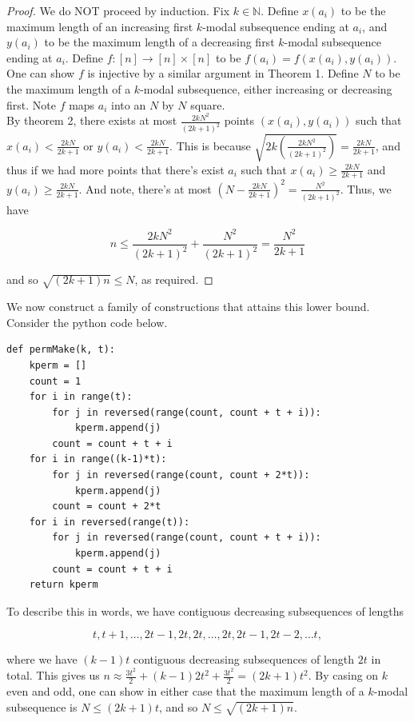 \documentclass{article}
\begin{document}
\begin{proof}
We do NOT proceed by induction. Fix $k \in \mathbb{N}$. Define $x(a_i)$ to be the maximum length of an increasing first $k$-modal subsequence ending at $a_i$, and $y(a_i)$ to be the maximum length of a decreasing first $k$-modal subsequence ending at $a_i$. Define $f : [n] \rightarrow [n] \times [n]$ to be $f(a_i) = f(x(a_i), y(a_i))$. One can show $f$ is injective by a similar argument in Theorem 1. Define $N$ to be the maximum length of a $k$-modal subsequence, either increasing or decreasing first. Note $f$ maps $a_i$ into an $N$ by $N$ square. \\

By theorem 2, there exists at most $\frac{2kN^2}{(2k+1)^2}$ points $(x(a_i), y(a_i))$ such that $x(a_i) < \frac{2kN}{2k+1}$ or $y(a_i) < \frac{2kN}{2k+1}$. This is because $\sqrt{2k(\frac{2kN^2}{(2k+1)^2})} = \frac{2kN}{2k+1}$, and thus if we had more points that there's exist $a_i$ such that $x(a_i) \geq \frac{2kN}{2k+1}$ and $y(a_i) \geq \frac{2kN}{2k+1}$. And note, there's at most $(N-\frac{2kN}{2k+1})^2 = \frac{N^2}{(2k+1)^2}$. Thus, we have 

$$n \leq \frac{2kN^2}{(2k+1)^2} + \frac{N^2}{(2k+1)^2} = \frac{N^2}{2k+1}$$

and so $\sqrt{(2k+1)n} \leq N$, as required.
\end{proof}

We now construct a family of constructions that attains this lower bound. Consider the python code below. \\

\begin{verbatim}
def permMake(k, t):
    kperm = []
    count = 1
    for i in range(t):
        for j in reversed(range(count, count + t + i)):
            kperm.append(j)
        count = count + t + i
    for i in range((k-1)*t):
        for j in reversed(range(count, count + 2*t)):
            kperm.append(j)
        count = count + 2*t
    for i in reversed(range(t)):
        for j in reversed(range(count, count + t + i)):
            kperm.append(j)
        count = count + t + i
    return kperm
\end{verbatim}

To describe this in words, we have contiguous decreasing subsequences of lengths 

$$t, t+1, \ldots, 2t-1, 2t, 2t, \ldots, 2t, 2t-1, 2t-2, \ldots t,$$

where we have $(k-1)t$ contiguous decreasing subsequences of length $2t$ in total. This gives us $n \approx \frac{3t^2}{2} + (k-1)2t^2 + \frac{3t^2}{2} = (2k+1)t^2$. By casing on $k$ even and odd, one can show in either case that the maximum length of a $k$-modal subsequence is $N \leq (2k+1)t$, and so $N \leq \sqrt{(2k+1)n}$. 
\end{document}
